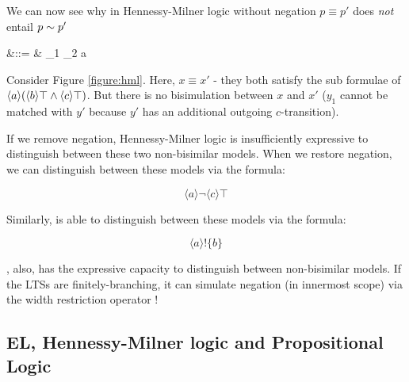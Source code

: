 
We can now see why in Hennessy-Milner logic without negation $p \equiv
p'$ does \emph{not} entail $p \sim p'$

\begin{GRAMMAR}
  \phi 
    &\quad ::= \quad&
  \top \fOr \phi_1 \AND \phi_2  \fOr \langle a \rangle \phi
\end{GRAMMAR}



\NI Consider Figure \ref{figure:hml}.  Here, $x \equiv x'$ - they both
satisfy the sub formulae of $\langle a \rangle (\langle b \rangle \top
\land \langle c \rangle \top)$.  But there is no bisimulation between
$x$ and $x'$ ($y_1$ cannot be matched with $y'$ because $y'$ has an
additional outgoing $c$-transition).

If we remove negation, Hennessy-Milner logic is insufficiently expressive to distinguish
between these two non-bisimilar models.  When we restore negation, we
can distinguish between these models via the formula:

\[
   \langle a \rangle \neg \langle c \rangle \top
\]

\NI Similarly, \ELABR{} is able to distinguish between these models via the
formula:

\[
  \langle a \rangle ! \{b\}
\]

\NI \ELABR{}, also, has the expressive capacity to distinguish between
non-bisimilar models. If the LTSs are finitely-branching, it can
simulate negation (in innermost scope) via the width restriction
operator !

\subsection{EL, Hennessy-Milner logic and Propositional Logic}


